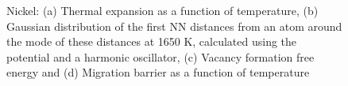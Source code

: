 \documentclass{article}
\begin{document}
\begin{figure}[!htp]
\centering
{}
\hfill
{}
\hfill
\caption{Nickel: (a) Thermal expansion as a function of temperature, (b) Gaussian distribution of the first NN distances from an atom around the mode of these distances at 1650 K, calculated using the potential \cite{Mishin2004} and a harmonic oscillator, (c) Vacancy formation free energy and (d) Migration barrier as a function of temperature}
\label{fig:11}
\end{figure}
\end{document}

